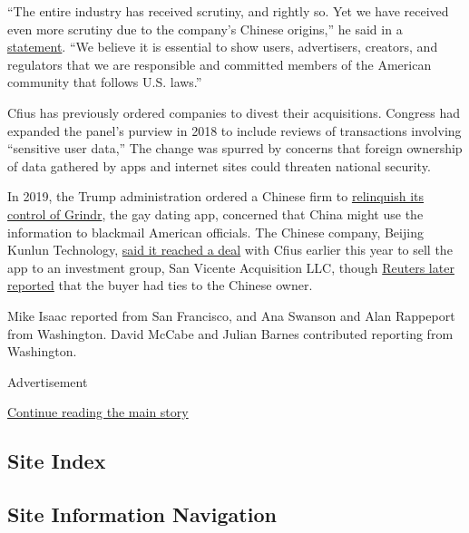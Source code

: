 ``The entire industry has received scrutiny, and rightly so. Yet we have
received even more scrutiny due to the company's Chinese origins,'' he
said in a
\href{https://newsroom.tiktok.com/en-us/fair-competition-and-transparency-benefits-us-all}{statement}.
``We believe it is essential to show users, advertisers, creators, and
regulators that we are responsible and committed members of the American
community that follows U.S. laws.''

Cfius has previously ordered companies to divest their acquisitions.
Congress had expanded the panel's purview in 2018 to include reviews of
transactions involving ``sensitive user data,'' The change was spurred
by concerns that foreign ownership of data gathered by apps and internet
sites could threaten national security.

In 2019, the Trump administration ordered a Chinese firm to
\href{https://www.nytimes3xbfgragh.onion/2019/03/28/us/politics/grindr-china-national-security.html}{relinquish
its control of Grindr}, the gay dating app, concerned that China might
use the information to blackmail American officials. The Chinese
company, Beijing Kunlun Technology,
\href{https://www.reuters.com/article/us-grindr-m-a-investors-exclusive/exclusive-grindrs-chinese-owner-nears-deal-to-sell-gay-dating-app-sources-idUSKBN20T0IR}{said
it reached a deal} with Cfius earlier this year to sell the app to an
investment group, San Vicente Acquisition LLC, though
\href{https://www.reuters.com/article/us-grindr-m-a-sanvicente-exclusive/exclusive-winning-bidder-for-grindr-has-ties-to-chinese-owner-idUSKBN2391AI}{Reuters
later reported} that the buyer had ties to the Chinese owner.

Mike Isaac reported from San Francisco, and Ana Swanson and Alan
Rappeport from Washington. David McCabe and Julian Barnes contributed
reporting from Washington.

Advertisement

\protect\hyperlink{after-bottom}{Continue reading the main story}

\hypertarget{site-index}{%
\subsection{Site Index}\label{site-index}}

\hypertarget{site-information-navigation}{%
\subsection{Site Information
Navigation}\label{site-information-navigation}}

